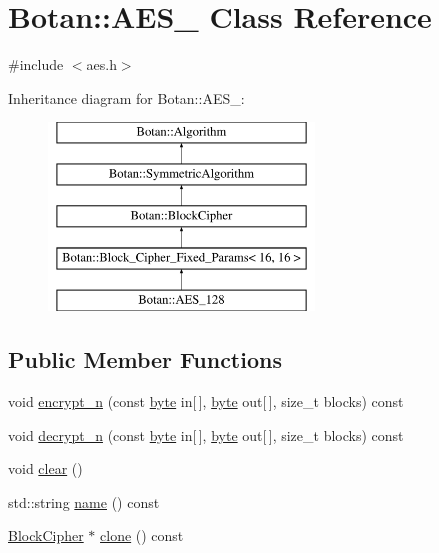 \hypertarget{classBotan_1_1AES__128}{\section{Botan\-:\-:A\-E\-S\-\_ Class Reference}
\label{classBotan_1_1AES__128}
}


{\ttfamily \#include $<$aes.\-h$>$}

Inheritance diagram for Botan\-:\-:A\-E\-S\-\_\-:\begin{figure}[H]
\begin{center}
\leavevmode
\includegraphics[height=5.000000cm]{classBotan_1_1AES__128}
\end{center}
\end{figure}
\subsection*{Public Member Functions}
\begin{DoxyCompactItemize}
\item 
void \hyperlink{classBotan_1_1AES__128_a8030a6f47bb79b47f335979871a0677c}{encrypt\-\_\-n} (const \hyperlink{namespaceBotan_a7d793989d801281df48c6b19616b8b84}{byte} in\mbox{[}$\,$\mbox{]}, \hyperlink{namespaceBotan_a7d793989d801281df48c6b19616b8b84}{byte} out\mbox{[}$\,$\mbox{]}, size\-\_\-t blocks) const 
\item 
void \hyperlink{classBotan_1_1AES__128_a5cdd835594fcedb31c5e8614d40f7e35}{decrypt\-\_\-n} (const \hyperlink{namespaceBotan_a7d793989d801281df48c6b19616b8b84}{byte} in\mbox{[}$\,$\mbox{]}, \hyperlink{namespaceBotan_a7d793989d801281df48c6b19616b8b84}{byte} out\mbox{[}$\,$\mbox{]}, size\-\_\-t blocks) const 
\item 
void \hyperlink{classBotan_1_1AES__128_a1f64c4c4e19ed5f2dd2ef860359e492f}{clear} ()
\item 
std\-::string \hyperlink{classBotan_1_1AES__128_a2de6a86dbd60c11062cf2d1f706f1683}{name} () const 
\item 
\hyperlink{classBotan_1_1BlockCipher}{Block\-Cipher} $\ast$ \hyperlink{classBotan_1_1AES__128_a3774a578934352de2df8f03906962b0a}{clone} () const 
\end{DoxyCompactItemize}
